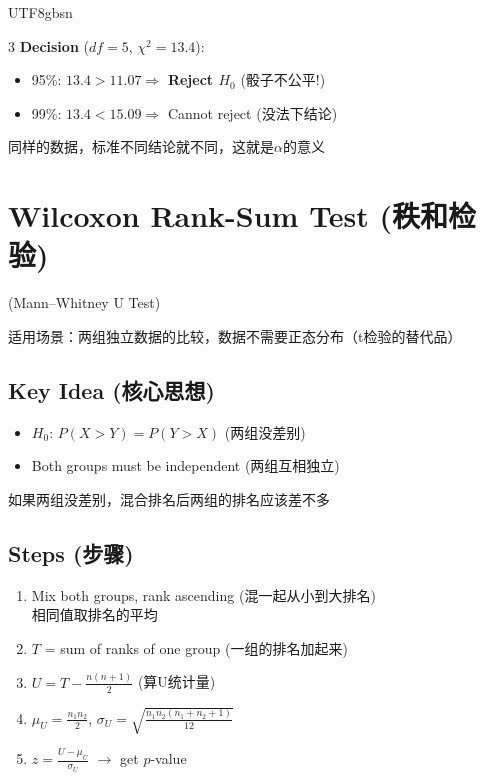 \documentclass[10pt,landscape,a4paper]{article}
\newcommand{\zhint}[1]{{\scriptsize\color{gray!70!black}#1}}
\begin{document}
\begin{CJK}{UTF8}{gbsn}
\begin{multicols}{3}
\textbf{Decision} ($df=5$, $\chi^2 = 13.4$):
\begin{itemize}[leftmargin=*, nosep, itemsep=0pt]
    \item 95\%: $13.4 > 11.07 \Rightarrow$ \textbf{Reject $H_0$} \zhint{(骰子不公平!)}
    \item 99\%: $13.4 < 15.09 \Rightarrow$ Cannot reject \zhint{(没法下结论)}
\end{itemize}
\zhint{同样的数据，标准不同结论就不同，这就是$\alpha$的意义}

\section{Wilcoxon Rank-Sum Test \zhint{(秩和检验)}}
\small{(Mann--Whitney U Test)}

\zhint{适用场景：两组独立数据的比较，数据不需要正态分布（t检验的替代品）}

\subsection{Key Idea \zhint{(核心思想)}}
\begin{itemize}[leftmargin=*, nosep, itemsep=0pt]
    \item $H_0$: $P(X > Y) = P(Y > X)$ \zhint{(两组没差别)}
    \item Both groups must be independent \zhint{(两组互相独立)}
\end{itemize}
\zhint{如果两组没差别，混合排名后两组的排名应该差不多}

\subsection{Steps \zhint{(步骤)}}
\begin{enumerate}[leftmargin=*, nosep, itemsep=1pt]
    \item Mix both groups, rank ascending \zhint{(混一起从小到大排名)}\\
    \zhint{相同值取排名的平均}
    \item $T$ = sum of ranks of one group \zhint{(一组的排名加起来)}
    \item $U = T - \frac{n(n+1)}{2}$ \zhint{(算U统计量)}
    \item $\mu_U = \frac{n_1 n_2}{2}$, \; $\sigma_U = \sqrt{\frac{n_1 n_2 (n_1+n_2+1)}{12}}$
    \item $z = \frac{U - \mu_U}{\sigma_U}$ $\to$ get $p$-value
\end{enumerate}


\end{multicols}
\end{CJK}
\end{document}
